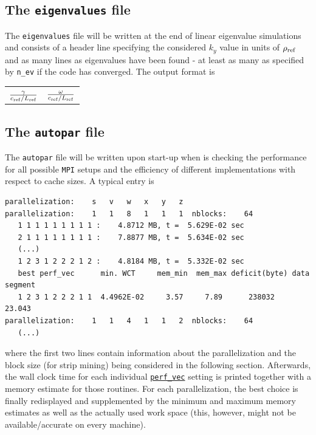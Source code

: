 \documentclass[12pt]{article}
\begin{document}
\subsection{The \texttt{eigenvalues} file}
\label{subsec:eigenvalues-file}

The {\tt eigenvalues} file will be written at the end of linear eigenvalue simulations 
and consists of a header line specifying the considered $k_y$ value in units of $\rho_{\rm ref}$ and 
as many lines as eigenvalues have been found - at least as many as specified by {\tt n\_ev} 
if the code has converged. The output format is
\begin{center}
\begin{tabular}{ll}
$\frac{\gamma}{c_{\rm ref}/L_{\rm ref}}$ & $\frac{\omega}{c_{\rm ref} / L_{\rm ref}}$
\end{tabular}
\end{center}


\subsection{The \texttt{autopar} file}
\label{subsec:autopar-file}

The {\tt autopar} file will be written upon start-up when \gene is checking the performance for 
all possible {\tt MPI} setups and the efficiency of different implementations with respect to cache sizes.
A typical entry is
{\scriptsize
\begin{verbatim}
parallelization:    s   v   w   x   y   z
parallelization:    1   1   8   1   1   1  nblocks:    64
   1 1 1 1 1 1 1 1 1 :    4.8712 MB, t =  5.629E-02 sec
   2 1 1 1 1 1 1 1 1 :    7.8877 MB, t =  5.634E-02 sec
   (...)
   1 2 3 1 2 2 2 1 2 :    4.8184 MB, t =  5.332E-02 sec
   best perf_vec      min. WCT     mem_min  mem_max deficit(byte) data segment
   1 2 3 1 2 2 2 1 1  4.4962E-02     3.57     7.89      238032    23.043
parallelization:    1   1   4   1   1   2  nblocks:    64
   (...)
\end{verbatim}}
where the first two lines contain information about the parallelization and the block size (for 
strip mining) being considered in the following section. Afterwards, the wall clock time for each 
individual \hyperlink{perf_vec}{\tt perf\_vec} setting is printed together with a memory estimate 
for those routines. For each parallelization, the best choice is finally redisplayed and 
supplemented by the minimum and maximum memory estimates as well as the actually used work space 
(this, however, might not be available/accurate on every machine).
\end{document}
